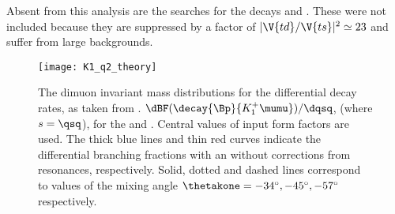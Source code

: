 Absent from this analysis are the searches for the decays \decay{\Bp}{\Kp\Km\pip\mumu}
and \decay{\Bp}{\pipi\pim\mumu}.
These were not included because they are suppressed by a factor of $|\V{td}/\V{ts}|^2\simeq23$ and
suffer from large backgrounds.



\begin{figure}
  \begin{center}
    \texttt{[image: K1\_q2\_theory]}
    \caption{\small
      The dimuon invariant mass distributions for the differential decay rates, as taken from
      .
      $\dBF(\decay{\Bp}{K_1^+\mumu})/\dqsq$, (where $s=\qsq$), for the  and .
      Central values of input form factors are used.
      The thick blue lines and thin red curves indicate the differential branching fractions with
      an without corrections from resonances, respectively.
      Solid, dotted and dashed lines correspond to values of the mixing angle
      $\thetakone=-34^\circ,-45^\circ,-57^\circ$ respectively.
    }
    \label{fig:th:thetak1}
  \end{center}
\end{figure}


